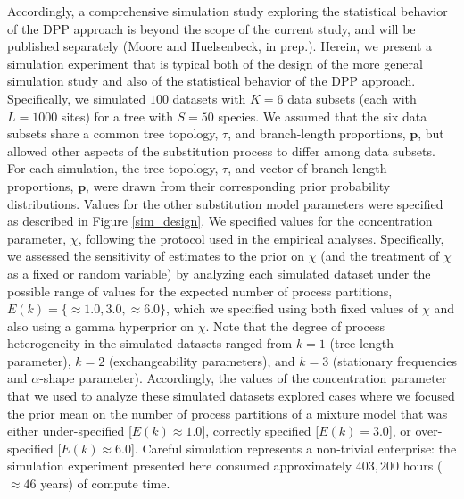 \documentclass[11pt]{article}
\begin{document}
Accordingly, a comprehensive simulation study exploring the statistical behavior of the DPP approach is beyond the scope of the current study, and will be published separately (Moore and Huelsenbeck, in prep.).  
Herein, we present a simulation experiment that is typical both of the design of the more general simulation study and also of the statistical behavior of the DPP approach. 
Specifically, we simulated $100$ datasets with $K=6$ data subsets (each with $L = 1000$ sites) for a tree with $S=50$ species.
We assumed that the six data subsets share a common tree topology, $\tau$, and branch-length proportions, ${\mathbf p}$, but allowed other aspects of the substitution process to differ among data subsets.
For each simulation, the tree topology, $\tau$, and vector of branch-length proportions, ${\mathbf p}$, were drawn from their corresponding prior probability distributions.
Values for the other substitution model parameters were specified as described in Figure \ref{sim_design}.  
We specified values for the concentration parameter, $\chi$, following the protocol used in the empirical analyses.
Specifically, we assessed the sensitivity of estimates to the prior on $\chi$ (and the treatment of $\chi$ as a fixed or random variable)
by analyzing each simulated dataset under the possible range of values for the expected number of process partitions, $E(k)=\{\approx 1.0, 3.0, \approx 6.0\}$, which we specified using both fixed values of $\chi$ and also using a gamma hyperprior on $\chi$.
Note that the degree of process heterogeneity in the simulated datasets ranged from $k = 1$ (tree-length parameter), $k = 2$ (exchangeability parameters), and $k = 3$ (stationary frequencies and $\alpha$-shape parameter).
Accordingly, the values of the concentration parameter that we used to analyze these simulated datasets explored cases where we focused the prior mean on the number of process partitions of a mixture model that was either under-specified [$E(k) \approx 1.0$], correctly specified [$E(k) = 3.0$], or over-specified [$E(k) \approx 6.0$].
Careful simulation represents a non-trivial enterprise: the simulation experiment presented here consumed approximately $403,200$ hours ($\approx 46$ years) of compute time. 
\end{document}
